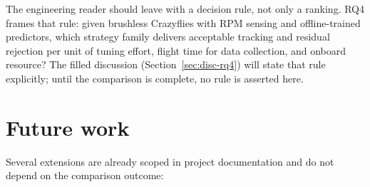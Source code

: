 The engineering reader should leave with a decision rule, not only a ranking. RQ4 frames that rule:
given brushless Crazyflies with RPM sensing and offline-trained predictors, which strategy family
delivers acceptable tracking and residual rejection per unit of tuning effort, flight time for data
collection, and onboard resource? The filled discussion (Section~\ref{sec:disc-rq4}) will state that
rule explicitly; until the comparison is complete, no rule is asserted here.

\section{Future work}
\label{sec:conclusion-future}

Several extensions are already scoped in project documentation and do not depend on the comparison outcome:

